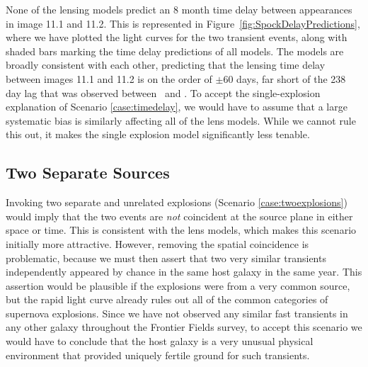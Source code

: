 None of the lensing models predict an 8 month time delay between
appearances in image 11.1 and 11.2.  This is represented in
Figure~\ref{fig:SpockDelayPredictions}, where we have plotted the
light curves for the two transient events, along with shaded bars
marking the time delay predictions of all models.  The models are
broadly consistent with each other, predicting that the lensing time
delay between images 11.1 and 11.2 is on the order of $\pm$60 days,
far short of the 238 day lag that was observed between \spockone\ and
\spocktwo.  To accept the single-explosion explanation of Scenario
\ref{case:timedelay}, we would have to assume that a large systematic
bias is similarly affecting all of the lens models.  While we cannot
rule this out, it makes the single explosion model significantly less
tenable.



\subsection{Two Separate Sources}

Invoking two separate and unrelated explosions (Scenario
\ref{case:twoexplosions}) would imply that the two events are {\it
  not} coincident at the source plane in either space or time.  This
is consistent with the lens models, which makes this scenario
initially more attractive.  However, removing the spatial coincidence
is problematic, because we must then assert that two very similar
transients independently appeared by chance in the same host galaxy in
the same year.  This assertion would be plausible if the explosions
were from a very common source, but the rapid light curve already
rules out all of the common categories of supernova explosions.  Since
we have not observed any similar fast transients in any other galaxy
throughout the Frontier Fields survey, to accept this scenario we
would have to conclude that the \spock host galaxy is a very unusual
physical environment that provided uniquely fertile ground for such
transients.





